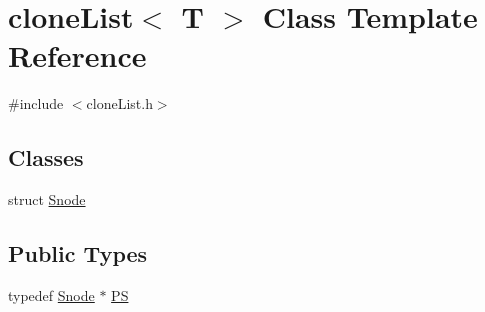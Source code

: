 \hypertarget{classclone_list}{
\section{cloneList$<$ T $>$ Class Template Reference}
\label{classclone_list}
}


{\ttfamily \#include $<$cloneList.h$>$}\subsection*{Classes}
\begin{DoxyCompactItemize}
\item 
struct \hyperlink{structclone_list_1_1_snode}{Snode}
\end{DoxyCompactItemize}
\subsection*{Public Types}
\begin{DoxyCompactItemize}
\item 
typedef \hyperlink{structclone_list_1_1_snode}{Snode} $\ast$ \hyperlink{classclone_list_ac029edd1aa35f72f80aa0e52d8cfd106}{PS}
\end{DoxyCompactItemize}
